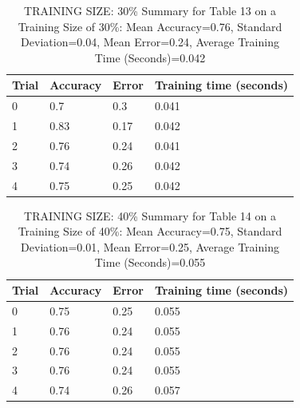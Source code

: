 \documentclass{article}
\begin{document}
\begin{table}[H]

\centering
{\begin{tabular}{||p{1cm}|p{1.8cm}|p{1.8cm}|p{3cm}||}
 \hline
Trial & Accuracy & Error & Training time (seconds) \\ [0.5ex] 
 \hline\hline
   0  & 0.7  & 0.3  & 0.041\\
\hline
   1  & 0.83  & 0.17  & 0.042\\
\hline
   2  & 0.76  & 0.24  & 0.041\\
\hline
   3  & 0.74  & 0.26  & 0.042\\
\hline
   4  & 0.75  & 0.25  & 0.042\\
\hline

\end{tabular}}
\caption{TRAINING SIZE: 30\% \newline Summary for Table 13 on a Training Size of 30\%: Mean Accuracy=0.76, Standard Deviation=0.04, Mean Error=0.24, Average Training Time (Seconds)=0.042}
\end{table} 

\begin{table}[H]

\centering
{\begin{tabular}{||p{1cm}|p{1.8cm}|p{1.8cm}|p{3cm}||}
 \hline
Trial & Accuracy & Error & Training time (seconds) \\ [0.5ex] 
 \hline\hline
   0  & 0.75  & 0.25  & 0.055\\
\hline
   1  & 0.76  & 0.24  & 0.055\\
\hline
   2  & 0.76  & 0.24  & 0.055\\
\hline
   3  & 0.76  & 0.24  & 0.055\\
\hline
   4  & 0.74  & 0.26  & 0.057\\
\hline

\end{tabular}}
\caption{TRAINING SIZE: 40\% \newline Summary for Table 14 on a Training Size of 40\%: Mean Accuracy=0.75, Standard Deviation=0.01, Mean Error=0.25, Average Training Time (Seconds)=0.055}
\end{table} 
\end{document}
